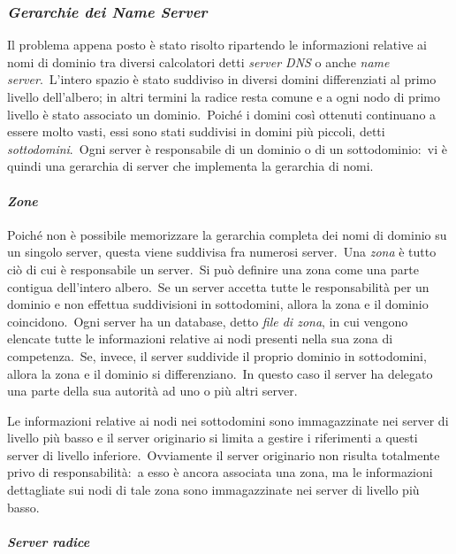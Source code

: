 \subsubsection{\emph{Gerarchie dei Name Server}}

Il problema appena posto è stato risolto ripartendo le informazioni relative ai nomi di dominio tra diversi calcolatori detti \emph{server DNS} o anche \emph{name server}.\
L'intero spazio è stato suddiviso in diversi domini differenziati al primo livello dell'albero; in altri termini la radice resta comune e a ogni nodo di primo livello è stato associato un dominio.\
Poiché i domini così ottenuti continuano a essere molto vasti, essi sono stati suddivisi in domini più piccoli, detti \emph{sottodomini}.\
Ogni server è responsabile di un dominio o di un sottodominio:\ vi è quindi una gerarchia di server che implementa la gerarchia di nomi.

\paragraph{\emph{Zone}}

Poiché non è possibile memorizzare la gerarchia completa dei nomi di dominio su un singolo server, questa viene suddivisa fra numerosi server.\
Una \emph{zona} è tutto ciò di cui è responsabile un server.\
Si può definire una zona come una parte contigua dell'intero albero.\
Se un server accetta tutte le responsabilità per un dominio e non effettua suddivisioni in sottodomini, allora la zona e il dominio coincidono.\
Ogni server ha un database, detto \emph{file di zona}, in cui vengono elencate tutte le informazioni relative ai nodi presenti nella sua zona di competenza.\
Se, invece, il server suddivide il proprio dominio in sottodomini, allora la zona e il dominio si differenziano.\
In questo caso il server ha delegato una parte della sua autorità ad uno o più altri server.

Le informazioni relative ai nodi nei sottodomini sono immagazzinate nei server di livello più basso e il server originario si limita a gestire i riferimenti a questi server di livello inferiore.\
Ovviamente il server originario non risulta totalmente privo di responsabilità:\ a esso è ancora associata una zona, ma le informazioni dettagliate sui nodi di tale zona sono immagazzinate nei server di livello più basso.

\paragraph{\emph{Server radice}}

